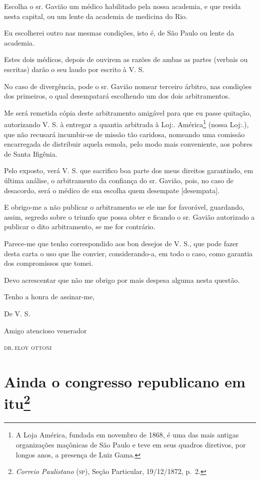 Escolha o sr. Gavião um médico habilitado pela nossa academia, e que
resida nesta capital, ou um lente da academia de medicina do Rio.

Eu escolherei outro nas mesmas condições, isto é, de São Paulo ou lente
da academia.

Estes dois médicos, depois de ouvirem as razões de ambas as partes
(verbais ou escritas) darão o seu laudo por escrito à V. S.

No caso de divergência, pode o sr. Gavião nomear terceiro árbitro, nas
condições dos primeiros, o qual desempatará escolhendo um dos dois
arbitramentos.

Me será remetida cópia deste arbitramento amigável para que eu passe
quitação, autorizando V. S. à entregar a quantia arbitrada à Loj:.
América\footnote{ A Loja América, fundada em novembro de 1868, é uma
  das mais antigas organizações maçônicas de São Paulo e teve em seus
  quadros diretivos, por longos anos, a presença de Luiz Gama.} (nossa
Loj:.), que não recusará incumbir-se de missão tão caridosa, nomeando
uma comissão encarregada de distribuir aquela esmola, pelo modo mais
conveniente, aos pobres de Santa Ifigênia.

Pelo exposto, verá V. S. que sacrifico boa parte dos meus direitos
garantindo, em última análise, o arbitramento da confiança do sr.
Gavião, pois, no caso de desacordo, será o médico de sua escolha quem
desempate {[}desempata{]}.

E obrigo-me a não publicar o arbitramento se ele me for favorável,
guardando, assim, segredo sobre o triunfo que possa obter e ficando o
sr. Gavião autorizado a publicar o dito arbitramento, se me for
contrário.

Parece-me que tenho correspondido aos bon desejos de V. S., que pode
fazer desta carta o uso que lhe convier, considerando-a, em todo o caso,
como garantia dos compromissos que tomei.

Devo acrescentar que não me obrigo por mais despesa alguma nesta
questão.

Tenho a honra de assinar-me,

\begin{flushright}
De V. S.

Amigo atencioso venerador

\textsc{dr.\,eloy ottoni}
\end{flushright}

\chapter{Ainda o congresso republicano em itu\footnote{\emph{Correio Paulistano} (\textsc{sp}), Seção Particular,
  19/12/1872, p.~2.}} %


